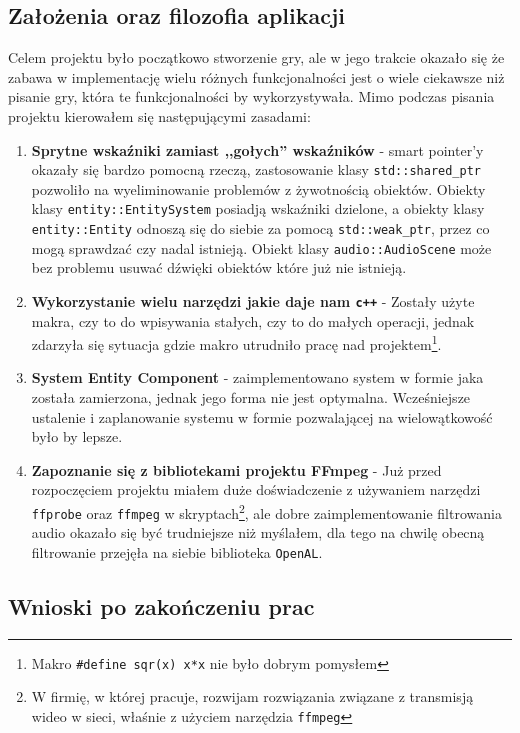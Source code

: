 \documentclass[a4paper,11pt]{article}
\begin{document}
\subsection{Założenia oraz filozofia aplikacji}

Celem projektu było początkowo stworzenie gry, ale w jego trakcie okazało się że zabawa w implementację wielu różnych funkcjonalności jest o wiele ciekawsze niż pisanie gry, która te funkcjonalności by wykorzystywała. Mimo podczas pisania projektu kierowałem się następującymi zasadami:

\begin{enumerate}
    \item \textbf{Sprytne wskaźniki zamiast ,,gołych'' wskaźników} - smart pointer'y okazały się bardzo pomocną rzeczą, zastosowanie klasy \texttt{std::shared\_ptr} pozwoliło na wyeliminowanie problemów z żywotnością obiektów. Obiekty klasy \texttt{entity::EntitySystem} posiadją wskaźniki dzielone, a obiekty klasy \texttt{entity::Entity} odnoszą się do siebie za pomocą \texttt{std::weak\_ptr}, przez co mogą sprawdzać czy nadal istnieją. Obiekt klasy \texttt{audio::AudioScene} może bez problemu usuwać dźwięki obiektów które już nie istnieją.
    \item \textbf{Wykorzystanie wielu narzędzi jakie daje nam \texttt{c++}} - Zostały użyte makra, czy to do wpisywania stałych, czy to do małych operacji, jednak zdarzyła się sytuacja gdzie makro utrudniło pracę nad projektem\footnote{Makro \texttt{\#define sqr(x) x*x} nie było dobrym pomysłem}.
    \item \textbf{System Entity Component} - zaimplementowano system w formie jaka została zamierzona, jednak jego forma nie jest optymalna. Wcześniejsze ustalenie i zaplanowanie systemu w formie pozwalającej na wielowątkowość było by lepsze.
    \item \textbf{Zapoznanie się z bibliotekami projektu FFmpeg} - Już przed
        rozpoczęciem projektu miałem duże doświadczenie z używaniem narzędzi
        \texttt{ffprobe} oraz \texttt{ffmpeg} w skryptach\footnote{W firmię, w
        której pracuje, rozwijam rozwiązania związane z transmisją wideo w
        sieci, właśnie z użyciem narzędzia \texttt{ffmpeg}}, ale dobre zaimplementowanie filtrowania audio okazało się być trudniejsze niż myślałem, dla tego na chwilę obecną filtrowanie przejęła na siebie biblioteka \texttt{OpenAL}.
\end{enumerate}

\subsection{Wnioski po zakończeniu prac}
\end{document}
